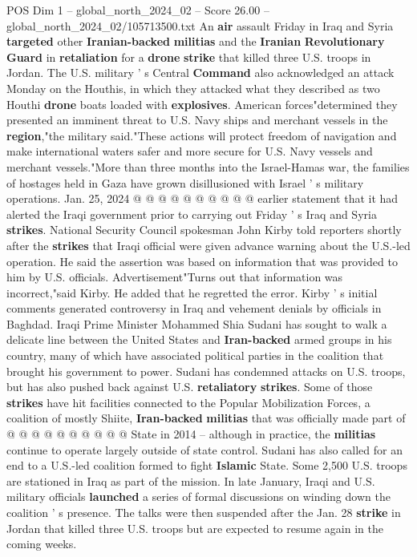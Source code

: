 \begin{textsample}{POS Dim 1 – global\_north\_2024\_02 – Score 26.00 – global\_north\_2024\_02/105713500.txt}
An \textbf{air} assault Friday in Iraq and Syria \textbf{targeted} other \textbf{Iranian-backed} \textbf{militias} and the \textbf{Iranian} \textbf{Revolutionary} \textbf{Guard} in \textbf{retaliation} for a \textbf{drone} \textbf{strike} that killed three U.S. troops in Jordan.
The U.S. military ' s Central \textbf{Command} also acknowledged an attack Monday on the Houthis, in which they attacked what they described as two Houthi \textbf{drone} boats loaded with \textbf{explosives}.
American forces"determined they presented an imminent threat to U.S.
Navy ships and merchant vessels in the \textbf{region},"the military said."These actions will protect freedom of navigation and make international waters safer and more secure for U.S.
Navy vessels and merchant vessels."More than three months into the Israel-Hamas war, the families of hostages held in Gaza have grown disillusioned with Israel ' s military operations.
Jan. 25, 2024 @ @ @ @ @ @ @ @ @ @ earlier statement that it had alerted the Iraqi government prior to carrying out Friday ' s Iraq and Syria \textbf{strikes}.
National Security Council spokesman John Kirby told reporters shortly after the \textbf{strikes} that Iraqi official were given advance warning about the U.S.-led operation.
He said the assertion was based on information that was provided to him by U.S. officials.
Advertisement"Turns out that information was incorrect,"said Kirby.
He added that he regretted the error.
Kirby ' s initial comments generated controversy in Iraq and vehement denials by officials in Baghdad.
Iraqi Prime Minister Mohammed Shia Sudani has sought to walk a delicate line between the United States and \textbf{Iran-backed} armed groups in his country, many of which have associated political parties in the coalition that brought his government to power.
Sudani has condemned attacks on U.S. troops, but has also pushed back against U.S. \textbf{retaliatory} \textbf{strikes}.
Some of those \textbf{strikes} have hit facilities connected to the Popular Mobilization Forces, a coalition of mostly Shiite, \textbf{Iran-backed} \textbf{militias} that was officially made part of @ @ @ @ @ @ @ @ @ @ State in 2014 -- although in practice, the \textbf{militias} continue to operate largely outside of state control.
Sudani has also called for an end to a U.S.-led coalition formed to fight \textbf{Islamic} State.
Some 2,500 U.S. troops are stationed in Iraq as part of the mission.
In late January, Iraqi and U.S. military officials \textbf{launched} a series of formal discussions on winding down the coalition ' s presence.
The talks were then suspended after the Jan. 28 \textbf{strike} in Jordan that killed three U.S. troops but are expected to resume again in the coming weeks.

\end{textsample}
